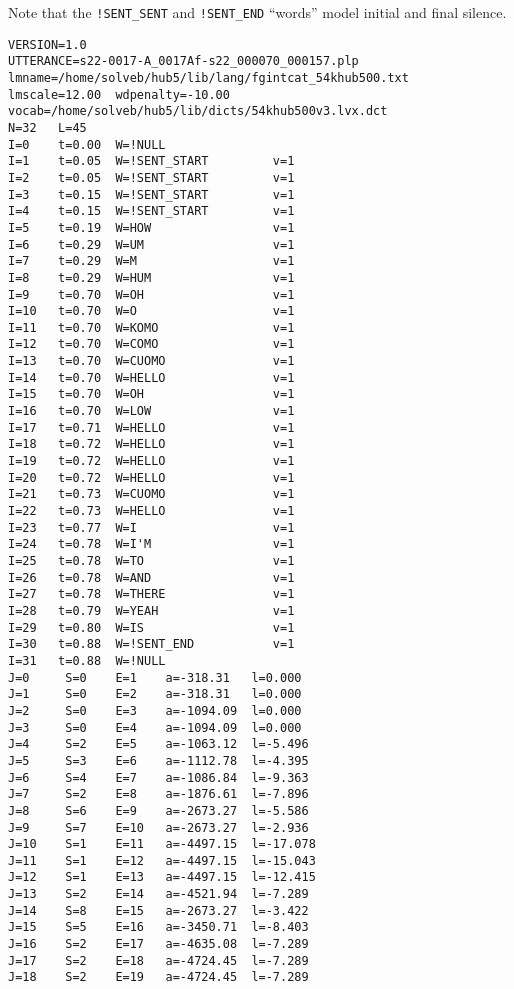 Note that the \verb|!SENT_SENT| and \verb|!SENT_END| ``words'' model
initial and final silence.

\begin{verbatim}
VERSION=1.0
UTTERANCE=s22-0017-A_0017Af-s22_000070_000157.plp
lmname=/home/solveb/hub5/lib/lang/fgintcat_54khub500.txt
lmscale=12.00  wdpenalty=-10.00
vocab=/home/solveb/hub5/lib/dicts/54khub500v3.lvx.dct
N=32   L=45   
I=0    t=0.00  W=!NULL               
I=1    t=0.05  W=!SENT_START         v=1  
I=2    t=0.05  W=!SENT_START         v=1  
I=3    t=0.15  W=!SENT_START         v=1  
I=4    t=0.15  W=!SENT_START         v=1  
I=5    t=0.19  W=HOW                 v=1  
I=6    t=0.29  W=UM                  v=1  
I=7    t=0.29  W=M                   v=1  
I=8    t=0.29  W=HUM                 v=1  
I=9    t=0.70  W=OH                  v=1  
I=10   t=0.70  W=O                   v=1  
I=11   t=0.70  W=KOMO                v=1  
I=12   t=0.70  W=COMO                v=1  
I=13   t=0.70  W=CUOMO               v=1  
I=14   t=0.70  W=HELLO               v=1  
I=15   t=0.70  W=OH                  v=1  
I=16   t=0.70  W=LOW                 v=1  
I=17   t=0.71  W=HELLO               v=1  
I=18   t=0.72  W=HELLO               v=1  
I=19   t=0.72  W=HELLO               v=1  
I=20   t=0.72  W=HELLO               v=1  
I=21   t=0.73  W=CUOMO               v=1  
I=22   t=0.73  W=HELLO               v=1  
I=23   t=0.77  W=I                   v=1  
I=24   t=0.78  W=I'M                 v=1  
I=25   t=0.78  W=TO                  v=1  
I=26   t=0.78  W=AND                 v=1  
I=27   t=0.78  W=THERE               v=1  
I=28   t=0.79  W=YEAH                v=1  
I=29   t=0.80  W=IS                  v=1  
I=30   t=0.88  W=!SENT_END           v=1  
I=31   t=0.88  W=!NULL               
J=0     S=0    E=1    a=-318.31   l=0.000   
J=1     S=0    E=2    a=-318.31   l=0.000   
J=2     S=0    E=3    a=-1094.09  l=0.000   
J=3     S=0    E=4    a=-1094.09  l=0.000   
J=4     S=2    E=5    a=-1063.12  l=-5.496  
J=5     S=3    E=6    a=-1112.78  l=-4.395  
J=6     S=4    E=7    a=-1086.84  l=-9.363  
J=7     S=2    E=8    a=-1876.61  l=-7.896  
J=8     S=6    E=9    a=-2673.27  l=-5.586  
J=9     S=7    E=10   a=-2673.27  l=-2.936  
J=10    S=1    E=11   a=-4497.15  l=-17.078 
J=11    S=1    E=12   a=-4497.15  l=-15.043 
J=12    S=1    E=13   a=-4497.15  l=-12.415 
J=13    S=2    E=14   a=-4521.94  l=-7.289  
J=14    S=8    E=15   a=-2673.27  l=-3.422  
J=15    S=5    E=16   a=-3450.71  l=-8.403  
J=16    S=2    E=17   a=-4635.08  l=-7.289  
J=17    S=2    E=18   a=-4724.45  l=-7.289  
J=18    S=2    E=19   a=-4724.45  l=-7.289  

\end{verbatim}
